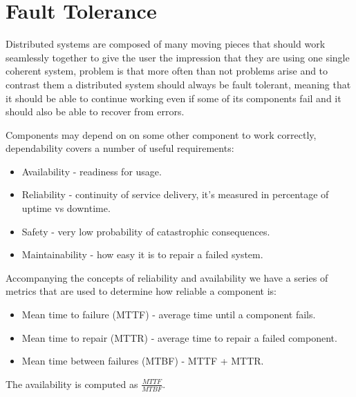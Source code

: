 \chapter{Fault Tolerance}
Distributed systems are composed of many moving pieces that should work seamlessly together to give the user the impression that they are using one single coherent system, problem is that more often than not problems arise and to contrast them a distributed system should always be fault tolerant, meaning that it should be able to continue working even if some of its components fail and it should also be able to recover from errors.

Components may depend on on some other component to work correctly, dependability covers a number of useful requirements:
\begin{itemize}
    \item Availability - readiness for usage.
    \item Reliability - continuity of service delivery, it's measured in percentage of uptime vs downtime.
    \item Safety - very low probability of catastrophic consequences.
    \item Maintainability - how easy it is to repair a failed system.
\end{itemize}
Accompanying the concepts of reliability and availability we have a series of metrics that are used to determine how reliable a component is:
\begin{itemize}
    \item Mean time to failure (MTTF) - average time until a component fails.
    \item Mean time to repair (MTTR) - average time to repair a failed component.
    \item Mean time between failures (MTBF) - MTTF + MTTR.
\end{itemize}
The availability is computed as $\frac{MTTF}{MTBF}$.

